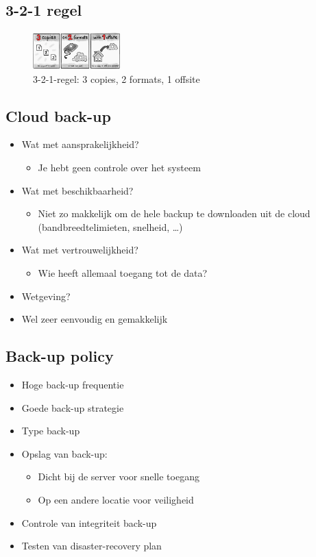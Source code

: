 \documentclass{article}
\begin{document}
\subsection{3-2-1 regel}

\begin{figure}[H]
    \centering
    \includegraphics[width=0.3\textwidth]{321-regel.png}
    \caption{3-2-1-regel: 3 copies, 2 formats, 1 offsite}
\end{figure}


\subsection{Cloud back-up}

\begin{itemize}
    \item Wat met aansprakelijkheid?
    \begin{itemize}
        \item Je hebt geen controle over het systeem
    \end{itemize}
    \item Wat met beschikbaarheid?
    \begin{itemize}
        \item Niet zo makkelijk om de hele backup te downloaden uit de cloud (bandbreedtelimieten, snelheid, \dots)
    \end{itemize}
    \item Wat met vertrouwelijkheid?
    \begin{itemize}
        \item Wie heeft allemaal toegang tot de data?
    \end{itemize}
    \item Wetgeving?
    \item Wel zeer eenvoudig en gemakkelijk
\end{itemize}

\subsection{Back-up policy}

\begin{itemize}
    \item Hoge back-up frequentie
    \item Goede back-up strategie
    \item Type back-up
    \item Opslag van back-up:
    \begin{itemize}
        \item Dicht bij de server voor snelle toegang
        \item Op een andere locatie voor veiligheid
    \end{itemize}
    \item Controle van integriteit back-up
    \item Testen van disaster-recovery plan
\end{itemize}
\end{document}
